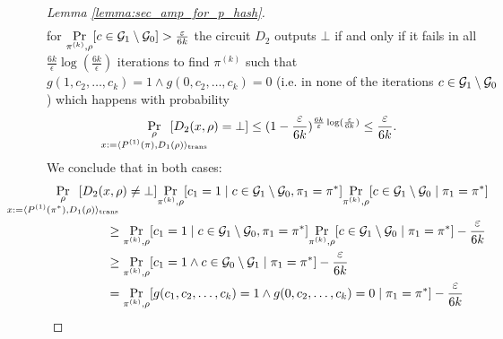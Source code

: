 \begin{proof}[Lemma \ref{lemma:sec_amp_for_p_hash}]
\begin{align}
\end{align}
for $\underset{\pi^{(k)}, \rho}{\Pr}[c \in \mathcal{G}_1 \setminus \mathcal{G}_0] > \frac{\varepsilon}{6k}$ the circuit $D_2$ outputs $\bot$
if and only if it fails in all $\frac{6k}{\epsilon} \log(\frac{6k}{\epsilon})$ iterations to find $\pi^{(k)}$ such that $g(1, c_2, \dots, c_k) = 1 \land g(0, c_2, \dots, c_k) = 0$
(i.e. in none of the iterations $c \in \mathcal{G}_1 \setminus \mathcal{G}_0$) which happens with probability
\begin{align}
\underset{
  \mathclap{
    \substack{
      \rho \\
      x := \langle P^{(1)}(\pi), D_1(\rho) \rangle_{\text{trans}}}}}
{\Pr}\mkern13mu[D_2(x,\rho) = \bot]
\leq (1 - \frac{\epsilon}{6k})^{\frac{6k}{\epsilon}\log(\frac{\epsilon}{6k})} \leq \frac{\epsilon}{6k}.
\end{align}
We conclude that in both cases:
\begin{align}
  \label{ineq:first_part}
  &\underset{
    \mathclap{
    \substack{\rho \\
      x := \langle P^{(1)}(\pi^*), D_1(\rho) \rangle_{\text{trans}}}}}
  {\Pr}\mkern13mu[D_2(x,\rho) \neq \bot]
  \underset{\pi^{(k)}, \rho}{\Pr}[c_1 = 1 \mid c \in \cG_1 \setminus \cG_0, \pi_1 = \pi^*]
  \underset{\pi^{(k)}, \rho}{\Pr}[c \in \cG_1 \setminus \cG_0 \mid \pi_1 = \pi^*] \notag\\
  &\IndII \geq \underset{\pi^{(k)}, \rho}{\Pr}[c_1 = 1 \mid c \in \cG_1 \setminus \cG_0, \pi_1 = \pi^*]\underset{\pi^{(k)}, \rho}
  {\Pr}[c \in \cG_1 \setminus \cG_0 \mid \pi_1 = \pi^*] - \frac{\epsilon}{6k} \notag\\
%
  &\IndII \geq \underset{\pi^{(k)}, \rho}{\Pr}[c_1 = 1 \land c \in \cG_0 \setminus \cG_1 \mid \pi_1 = \pi^*] - \frac{\epsilon}{6k} \notag\\
  &\IndII = \underset{\pi^{(k)}, \rho}{\Pr}[g(c_1, c_2,\dots, c_k) = 1 \land g(0, c_2, \dots, c_k) = 0 \mid \pi_1 = \pi^*] - \frac{\epsilon}{6k} \notag\\

\end{align}
\end{proof}
